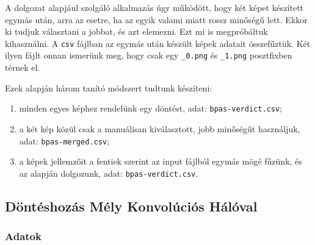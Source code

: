 A dolgozat alapjául szolgáló alkalmazás úgy működött, hogy két képet készített
egymás után, arra az esetre, ha az egyik valami miatt rossz minőségű lett. Ekkor ki tudjuk választani a jobbat, 
és azt elemezni. Ezt mi is megpróbáltuk kihasználni. A \texttt{csv} fájlban az egymás után készült képek adatait
összefűztük. Két ilyen fájlt onnan ismerünk meg, hogy csak egy \texttt{\_0.png} és \texttt{\_1.png}
posztfixben térnek el.

Ezek alapján három tanító módszert tudtunk készíteni\footnotemark:
\begin{enumerate}
	\item
	minden egyes képhez rendelünk egy döntést,
	adat: \texttt{bpas-verdict.csv};
	\item 
	a két kép közül csak a manuálisan kiválasztott, jobb minőségűt használjuk,
	adat: \texttt{bpas-merged.csv};
	
	\item 
	a képek jellemzőit a fentiek szerint az input fájlból egymás mögé 
	fűzünk, és az alapján dolgozunk,
	adat: \texttt{bpas-verdict.csv}.
\end{enumerate}

%
%
%
%
%
%


\subsection{Döntéshozás Mély Konvolúciós Hálóval}
\label{sec:cnn}


\subsubsection{Adatok}


